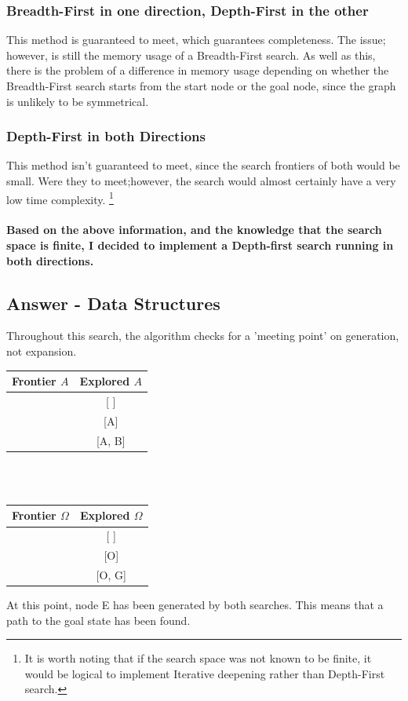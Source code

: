 \documentclass{article}
\begin{document}
\subsubsection{Breadth-First in one direction, Depth-First in the other}
This method is guaranteed to meet, which guarantees completeness. The issue; however, is still the memory usage of a Breadth-First search. As well as this, there is the problem of a difference in memory usage depending on whether the Breadth-First search starts from the start node or the goal node, since the graph is unlikely to be symmetrical.
\subsubsection{Depth-First in both Directions}
This method isn't guaranteed to meet, since the search frontiers of both would be small. Were they to meet;however, the search would almost certainly have a very low time complexity. \footnote{It is worth noting that if the search space was not known to be finite, it would be logical to implement Iterative deepening rather than Depth-First search.}
\\~\\
\textbf{Based on the above information, and the knowledge that the search space is finite, I decided to implement a Depth-first search running in both directions.} 
\subsection{Answer - Data Structures}
Throughout this search, the algorithm checks for a 'meeting point' on generation, not expansion.
\\
\begin{center}
    \begin{tabular}{ l | c}
    
    \hline
    \textbf{Frontier $A$} & \textbf{Explored $A$}\\
    
    \hline
    [A] &  [ ] \\ \hline 
    [B, C, D] & [A] \\ \hline
    [E, C, D] & [A, B] \\ \hline
        
    \end{tabular}
    \\~\\
    \begin{tabular}{ l | c}
    
    \hline
    \textbf{Frontier $\Omega$} & \textbf{Explored $\Omega$}\\
    
    \hline
    [O] &  [ ] \\ \hline 
    [G, I, M, N] & [O] \\ \hline
    [E, F, I, M, N] & [O, G] \\ \hline
       
    \end{tabular}
\end{center}  
At this point, node E has been generated by both searches. This means that a path to the goal state has been found.
\end{document}
